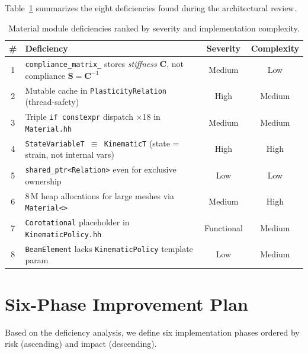 Table~\ref{tab:deficiencies} summarizes the eight deficiencies
found during the architectural review.

\begin{table}[htbp]
\centering
\small
\begin{tabular}{clcc}
\toprule
  \textbf{\#} & \textbf{Deficiency} & \textbf{Severity} & \textbf{Complexity} \\
\midrule
  1 & \texttt{compliance\_matrix\_} stores \emph{stiffness} $\mathbf{C}$, not compliance $\mathbf{S}=\mathbf{C}^{-1}$ & Medium & Low \\
  2 & Mutable cache in \texttt{PlasticityRelation} (thread-safety) & High & Medium \\
  3 & Triple \texttt{if constexpr} dispatch $\times$18 in \texttt{Material.hh} & Medium & Medium \\
  4 & \texttt{StateVariableT $\equiv$ KinematicT} (state = strain, not internal vars) & High & High \\
  5 & \texttt{shared\_ptr<Relation>} even for exclusive ownership & Low & Low \\
  6 & 8\,M heap allocations for large meshes via \texttt{Material<>} & Medium & High \\
  7 & \texttt{Corotational} placeholder in \texttt{KinematicPolicy.hh} & Functional & Medium \\
  8 & \texttt{BeamElement} lacks \texttt{KinematicPolicy} template param & Low & Medium \\
\bottomrule
\end{tabular}
\caption{Material module deficiencies ranked by severity and implementation complexity.}
\label{tab:deficiencies}
\end{table}


\section{Six-Phase Improvement Plan}
\label{sec:improvement-plan}

Based on the deficiency analysis, we define six implementation phases
ordered by risk (ascending) and impact (descending).

